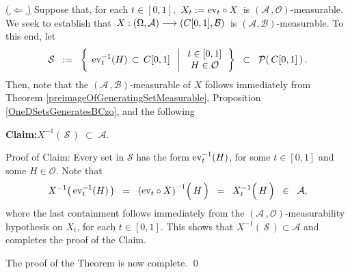 \vskip 0.5cm
\noindent
\underline{(\,$\Longleftarrow$\,)}\vskip 0.2cm
\noindent
Suppose that, for each $t \in [0,1]$, \,$X_{t} := \textnormal{ev}_{t} \circ X$\, is $(\mathcal{A}\,,\mathcal{O})$-measurable.
We seek to establish that \,$X : (\Omega,\mathcal{A}) \longrightarrow (C[0,1],\mathcal{B})$\, is $(\mathcal{A},\mathcal{B})$-measurable.
To this end, let
\begin{equation*}
\mathcal{S}
\;\; := \;\;
\left\{\;\,
\textnormal{ev}_{t}^{-1}(H) \,\subset\, C[0,1]
\;\;\left\vert\;
\begin{array}{c} t \in [0,1] \\ H \in \mathcal{O} \end{array}
\right.
\right\}
\;\; \subset \;\; \mathcal{P}\!\left(\,C[0,1]\,\right).
\end{equation*}
Then, note that the $(\mathcal{A}\,,\mathcal{B})$-measurable of $X$ follows immediately from
Theorem \ref{preimageOfGeneratingSetMeasurable},
Proposition \ref{OneDSetsGeneratesBCzo}, and
the following

\vskip 0.3cm
\begin{center}
\begin{minipage}{6.5in}
\noindent
\textbf{Claim:}\quad $X^{-1}\!\left(\,\mathcal{S}\,\right) \;\subset\; \mathcal{A}$.
\end{minipage}
\end{center}

\vskip 0.1cm
\noindent
Proof of Claim:\quad
Every set in $\mathcal{S}$ has the form $\textnormal{ev}_{t}^{-1}(H)$, for some $t \in [0,1]$ and some $H \in \mathcal{O}$.
Note that
\begin{equation*}
X^{-1}\!\left(\,\ev_{t}^{-1}(H)\,\right)
\;\; = \;\; \left(\ev_{t} \circ X\right)^{-1}\!\left(\,\overset{{\color{white}.}}{H}\,\right)
\;\; = \;\; X_{t}^{-1}\!\left(\,\overset{{\color{white}.}}{H}\,\right)
\;\; \in \;\; \mathcal{A},
\end{equation*}
where the last containment follows immediately from
the $(\mathcal{A}\,,\mathcal{O})$-measurability hypothesis on $X_{t}$, for each $t \in [0,1]$.
This shows that $X^{-1}\!\left(\,\mathcal{S}\,\right) \subset \mathcal{A}$ and
completes the proof of the Claim.

\vskip 0.3cm
\noindent
The proof of the Theorem is now complete.
\qed

